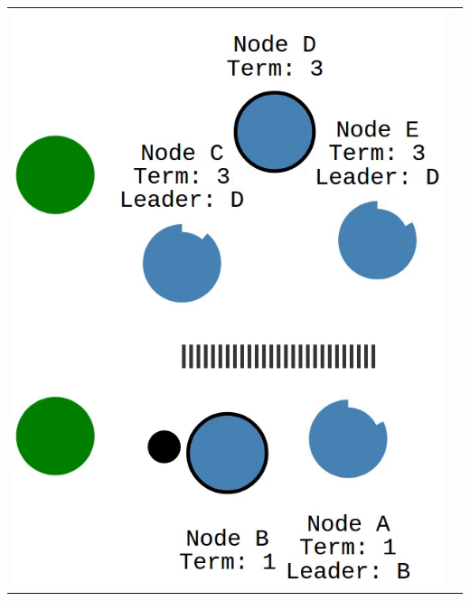 \begin{tabularx}{\textwidth}{ |X|X| }
  \includegraphics[scale=0.28]{scenarios/network_partition/1183.png} &

\end{tabularx}
